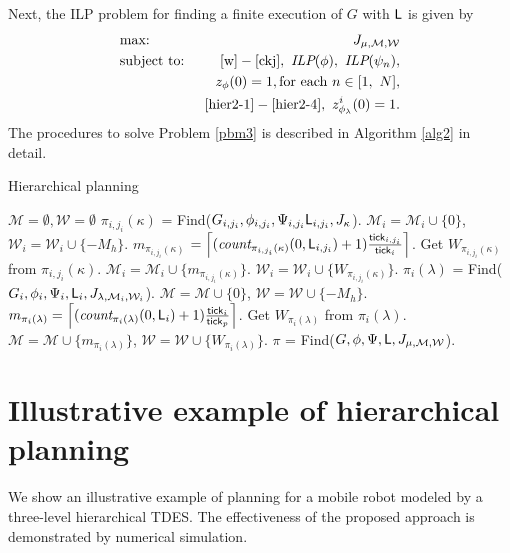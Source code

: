 \documentclass[journal,twoside,web]{IEEEtran}
\newcommand{\req}[1]{\eqref{#1}}
\newcommand{\tick}{{\sf tick}}
\newcommand{\Len}{{\sf L}}
\newcommand{\M}{\mathcal{M}}
\newcommand{\W}{\mathcal{W}}
\begin{document}
%
Next, the ILP problem for finding a finite execution of $G$ with $\Len$ is given by
%
\begin{eqnarray}
&\mbox{max: }&
J_{\mu,\M,\W}\notag \\
&\mbox{subject to: }&\req{w}-\req{ckj},\ \textit{ILP}(\phi),\ \textit{ILP}(\psi_n),\notag\\
&&z_{\phi} (0) = 1, {\rm{for\ each\ }}  n \in [1,\ N],\notag\\&&\req{hier2-1}-\req{hier2-4},~ z^{i}_{\phi_\lambda}(0)=1.\notag
\end{eqnarray}
%
The procedures to solve Problem \ref{pbm3} is described in Algorithm \ref{alg2} in detail.
%
\begin{algorithm}
\caption{Hierarchical planning} \label{alg2}
\begin{algorithmic}
%
\State $\mathcal{M}=\emptyset,\mathcal{W}=\emptyset$
		\State ${\pi_{i,j_i}(\kappa)}$ = Find($G_{i,j_i},\phi_{i,j_i},\Psi_{i,j_i}\Len_{i,j_i},J_\kappa$).
		\State $\mathcal{M}_i=\mathcal{M}_i\cup\{0\}$, $\mathcal{W}_i=\mathcal{W}_i\cup\{-M_h\}$.
		\Else
		\State $m_{\pi_{i,j_i}(\kappa)}$
		\State \hspace{1cm}$=\left\lceil (\textit{count}_{\pi_{i,j_i}(\kappa)}(0,\Len_{i,j_i})+1)\frac{\tick_{i,j_i}}{\tick_i} \right\rceil $.
		\State Get $W_{\pi_{i,j_i}(\kappa)}$ from $\pi_{i,j_i}(\kappa)$.
		\State $\mathcal{M}_i=\mathcal{M}_i\cup\{m_{\pi_{i,j_i}(\kappa)}\}$.
		\State $\mathcal{W}_i=\mathcal{W}_i\cup\{W_{\pi_{i,j_i}(\kappa)}\}$.
		\EndIf
	\EndFor
\EndFor
\EndFor
{}
\For{ $\lambda\in \Lambda$}
		\State ${\pi_i(\lambda)}$ = Find($G_i,\phi_i,\Psi_i,\Len_i,J_{\lambda,\M_i,\W_i}$).
		\State $\mathcal{M}=\mathcal{M}\cup\{0\}$, $\mathcal{W}=\mathcal{W}\cup\{-M_h\}$.
		\Else
		\State $m_{\pi_i(\lambda)}=\left\lceil (\textit{count}_{\pi_i(\lambda)}(0,\Len_i)+1)\frac{\tick_i}{\tick_p} \right\rceil $.
		\State Get $W_{\pi_i(\lambda)}$ from $\pi_i(\lambda)$.
		\State $\mathcal{M}=\mathcal{M}\cup\{m_{\pi_i(\lambda)}\}$, $\mathcal{W}=\mathcal{W}\cup\{W_{\pi_i(\lambda)}\}$.
		\EndIf
\EndFor
\EndFor
%
\State ${\pi}$ = Find($G,\phi,\Psi,\Len,J_{\mu,\M,\W}$).
\end{algorithmic}
\end{algorithm}
%
%
%
%
\section{Illustrative example of hierarchical planning}\label{simResult}
%
%
%
We show an illustrative example of planning for a mobile robot modeled by a three-level hierarchical TDES. %
The effectiveness of the proposed approach is demonstrated by numerical simulation.
%
\end{document}
